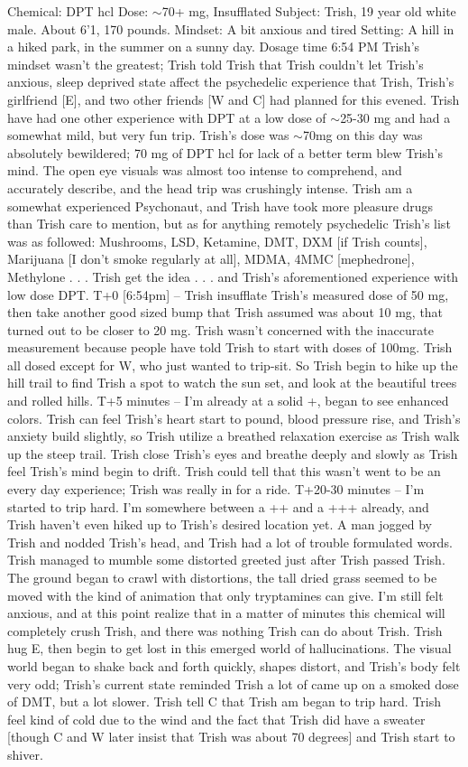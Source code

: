 \documentclass[12pt]{book}
\begin{document}
Chemical: DPT hcl Dose: $\sim$70+ mg, Insufflated Subject: Trish, 19 year old white male. About 6'1, 170 pounds. Mindset: A bit anxious and tired Setting: A hill in a hiked park, in the summer on a sunny day. Dosage time 6:54 PM Trish's mindset wasn't the greatest; Trish told Trish that Trish couldn't let Trish's anxious, sleep deprived state affect the psychedelic experience that Trish, Trish's girlfriend [E], and two other friends [W and C] had planned for this evened. Trish have had one other experience with DPT at a low dose of $\sim$25-30 mg and had a somewhat mild, but very fun trip. Trish's dose was $\sim$70mg on this day was absolutely bewildered; 70 mg of DPT hcl for lack of a better term blew Trish's mind. The open eye visuals was almost too intense to comprehend, and accurately describe, and the head trip was crushingly intense. Trish am a somewhat experienced Psychonaut, and Trish have took more pleasure drugs than Trish care to mention, but as for anything remotely psychedelic Trish's list was as followed: Mushrooms, LSD, Ketamine, DMT, DXM [if Trish counts], Marijuana [I don't smoke regularly at all], MDMA, 4MMC [mephedrone], Methylone . . .  Trish get the idea . . . and Trish's aforementioned experience with low dose DPT. T+0 [6:54pm] -- Trish insufflate Trish's measured dose of 50 mg, then take another good sized bump that Trish assumed was about 10 mg, that turned out to be closer to 20 mg. Trish wasn't concerned with the inaccurate measurement because people have told Trish to start with doses of 100mg. Trish all dosed except for W, who just wanted to trip-sit. So Trish begin to hike up the hill trail to find Trish a spot to watch the sun set, and look at the beautiful trees and rolled hills. T+5 minutes -- I'm already at a solid +, began to see enhanced colors. Trish can feel Trish's heart start to pound, blood pressure rise, and Trish's anxiety build slightly, so Trish utilize a breathed relaxation exercise as Trish walk up the steep trail. Trish close Trish's eyes and breathe deeply and slowly as Trish feel Trish's mind begin to drift. Trish could tell that this wasn't went to be an every day experience; Trish was really in for a ride. T+20-30 minutes -- I'm started to trip hard. I'm somewhere between a ++ and a +++ already, and Trish haven't even hiked up to Trish's desired location yet. A man jogged by Trish and nodded Trish's head, and Trish had a lot of trouble formulated words. Trish managed to mumble some distorted greeted just after Trish passed Trish. The ground began to crawl with distortions, the tall dried grass seemed to be moved with the kind of animation that only tryptamines can give. I'm still felt anxious, and at this point realize that in a matter of minutes this chemical will completely crush Trish, and there was nothing Trish can do about Trish. Trish hug E, then begin to get lost in this emerged world of hallucinations. The visual world began to shake back and forth quickly, shapes distort, and Trish's body felt very odd; Trish's current state reminded Trish a lot of came up on a smoked dose of DMT, but a lot slower. Trish tell C that Trish am began to trip hard. Trish feel kind of cold due to the wind and the fact that Trish did have a sweater [though C and W later insist that Trish was about 70 degrees] and Trish start to shiver. 
\end{document}
